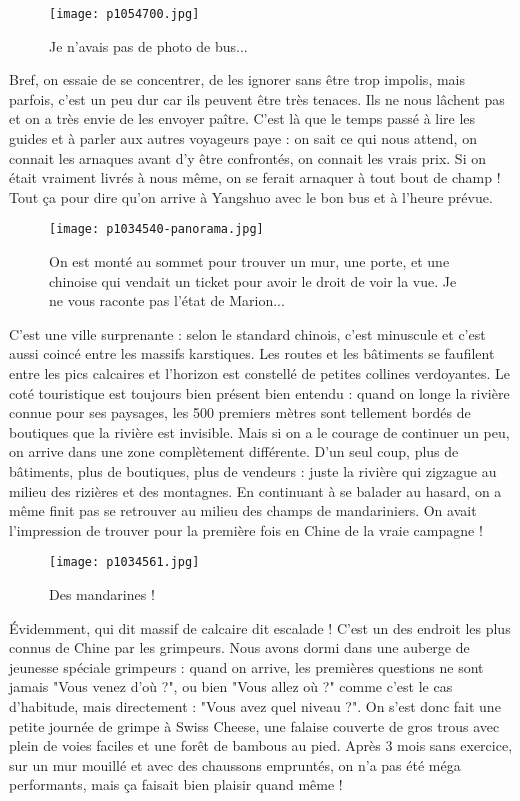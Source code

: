 \documentclass{book}
\begin{document}
\begin{figure}[h]
\centering
\texttt{[image: p1054700.jpg]}
\caption*{Je n'avais pas de photo de bus...}
\end{figure}

Bref, on essaie de se concentrer, de les ignorer sans être trop impolis, mais parfois, c'est un peu dur car ils peuvent être très tenaces. Ils ne nous lâchent pas et on a très envie de les envoyer paître. C'est là que le temps passé à lire les guides et à parler aux autres voyageurs paye : on sait ce qui nous attend, on connait les arnaques avant d'y être confrontés, on connait les vrais prix. Si on était vraiment livrés à nous même, on se ferait arnaquer à tout bout de champ ! Tout ça pour dire qu'on arrive à Yangshuo avec le bon bus et à l'heure prévue.


\begin{figure}[h]
\centering
\texttt{[image: p1034540-panorama.jpg]}
\caption*{On est monté au sommet pour trouver un mur, une porte, et une chinoise qui vendait un ticket pour avoir le droit de voir la vue. Je ne vous raconte pas l'état de Marion...}
\end{figure}

C'est une ville surprenante : selon le standard chinois, c'est minuscule et c'est aussi coincé entre les massifs karstiques. Les routes et les bâtiments se faufilent entre les pics calcaires et l'horizon est constellé de petites collines verdoyantes. Le coté touristique est toujours bien présent bien entendu : quand on longe la rivière connue pour ses paysages, les 500 premiers mètres sont tellement bordés de boutiques que la rivière est invisible. Mais si on a le courage de continuer un peu, on arrive dans une zone complètement différente. D'un seul coup, plus de bâtiments, plus de boutiques, plus de vendeurs : juste la rivière qui zigzague au milieu des rizières et des montagnes. En continuant à se balader au hasard, on a même finit pas se retrouver au milieu des champs de mandariniers. On avait l'impression de trouver pour la première fois en Chine de la vraie campagne !


\begin{figure}[h]
\centering
\texttt{[image: p1034561.jpg]}
\caption*{Des mandarines !}
\end{figure}

Évidemment, qui dit massif de calcaire dit escalade ! C'est un des endroit les plus connus de Chine par les grimpeurs. Nous avons dormi dans une auberge de jeunesse spéciale grimpeurs : quand on arrive, les premières questions ne sont jamais "Vous venez d'où ?", ou bien "Vous allez où ?" comme c'est le cas d'habitude, mais directement : "Vous avez quel niveau ?". On s'est donc fait une petite journée de grimpe à Swiss Cheese, une falaise couverte de gros trous avec plein de voies faciles et une forêt de bambous au pied. Après 3 mois sans exercice, sur un mur mouillé et avec des chaussons empruntés, on n'a pas été méga performants, mais ça faisait bien plaisir quand même !
\end{document}

